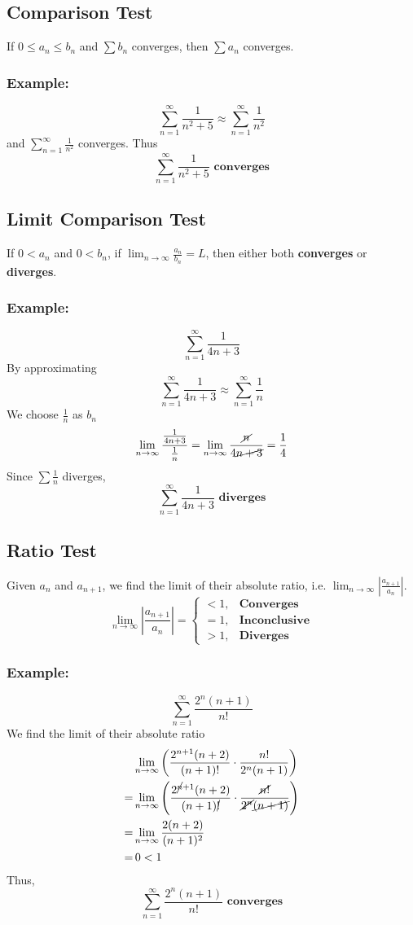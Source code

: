 \documentclass[11pt]{article}
\begin{document}
\subsection{Comparison Test}
If $0\le a_n \le b_n$ and $\sum b_n$ converges, then $\sum a_n$ converges.
\subsubsection*{Example:}
\[
  \sum_{n=1}^\infty \frac{1}{n^2+5} \approx \sum_{n=1}^\infty \frac{1}{n^2}
\]
and $\displaystyle\sum_{n=1}^\infty \frac{1}{n^2}$ converges. Thus
\[
  \sum_{n=1}^\infty \frac{1}{n^2+5}\textbf{ converges}
\]
\subsection{Limit Comparison Test}
If $0<a_n$ and $0<b_n$, if $\displaystyle\lim_{n\to\infty}\frac{a_n}{b_n}=L$, then either both \textbf{converges} or \textbf{diverges}.
\subsubsection*{Example:}
\[
  \sum_{n=1}^\infty \frac{1}{4n+3}
\]
By approximating
\[
  \displaystyle\sum_{n=1}^\infty \frac{1}{4n+3} \approx \sum_{n=1}^\infty \frac{1}{n}
\]
We choose $\displaystyle\frac{1}{n}$ as $b_n$
\[
  \lim_{n\to\infty} \frac{\frac{1}{4n+3}}{\frac{1}{n}}=\lim_{n\to\infty}\frac{\cancel{n}}{4\cancel{n+3}}=\frac{1}{4}
\]
Since $\displaystyle\sum\frac{1}{n}$ diverges,
\[
  \sum_{n=1}^\infty \frac{1}{4n+3}\textbf{ diverges}
\]
\subsection{Ratio Test}
Given $a_n$ and $a_{n+1}$, we find the limit of their absolute ratio, i.e. $\displaystyle\lim_{n\to\infty}\left|\frac{a_{n+1}}{a_n}\right|$. 
\[
  \lim_{n\to\infty}\left|\frac{a_{n+1}}{a_n}\right|=
  \begin{cases}
    <1, &\textbf{Converges}\\
    =1, &\textbf{Inconclusive}\\
    >1, &\textbf{Diverges}
  \end{cases}
\]
\subsubsection*{Example:}
\[
  \sum_{n=1}^\infty \frac{2^n(n+1)}{n!}
\]
We find the limit of their absolute ratio
\[
  \begin{aligned}
    &\lim_{n\to\infty} \left(\frac{2^{n+1}(n+2)}{(n+1)!}\cdot\frac{n!}{2^n(n+1)}\right)\\
    =&\lim_{n\to\infty} \left(
        \frac{2^{\cancel{n}+1}(n+2)}{(n+1)\cancel{!}}\cdot\frac{\cancel{n!}}{\cancel{2^n}\cancel{(n+1)}}
      \right)\\
    =&\lim_{n\to\infty}\frac{2(n+2)}{(n+1)^2}\\
    =&\,0<1
  \end{aligned}
\]
Thus,
\[
  \sum_{n=1}^\infty \frac{2^n(n+1)}{n!}\textbf{ converges}
\]
\end{document}
